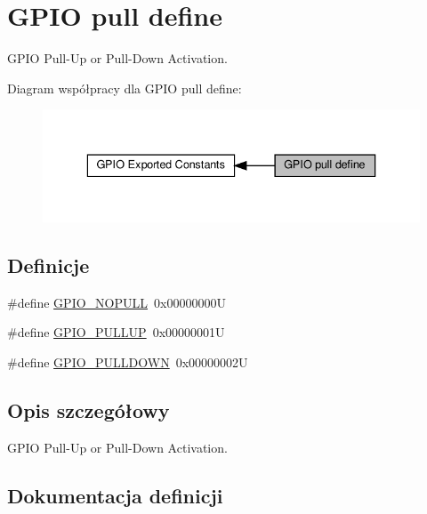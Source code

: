 \hypertarget{group___g_p_i_o__pull__define}{}\section{G\+P\+IO pull define}
\label{group___g_p_i_o__pull__define}


G\+P\+IO Pull-\/\+Up or Pull-\/\+Down Activation.  


Diagram współpracy dla G\+P\+IO pull define\+:\nopagebreak
\begin{figure}[H]
\begin{center}
\leavevmode
\includegraphics[width=336pt]{group___g_p_i_o__pull__define}
\end{center}
\end{figure}
\subsection*{Definicje}
\begin{DoxyCompactItemize}
\item 
\#define \hyperlink{group___g_p_i_o__pull__define_ga5c2862579882c1cc64e36d38fbd07a4c}{G\+P\+I\+O\+\_\+\+N\+O\+P\+U\+LL}~0x00000000U
\item 
\#define \hyperlink{group___g_p_i_o__pull__define_gae689bc8f5c42d6df7bd54a8dd372e072}{G\+P\+I\+O\+\_\+\+P\+U\+L\+L\+UP}~0x00000001U
\item 
\#define \hyperlink{group___g_p_i_o__pull__define_ga75d958d0410c36da7f27d1f4f5c36c14}{G\+P\+I\+O\+\_\+\+P\+U\+L\+L\+D\+O\+WN}~0x00000002U
\end{DoxyCompactItemize}


\subsection{Opis szczegółowy}
G\+P\+IO Pull-\/\+Up or Pull-\/\+Down Activation. 



\subsection{Dokumentacja definicji}
\mbox{\label{group___g_p_i_o__pull__define_ga5c2862579882c1cc64e36d38fbd07a4c}} 
